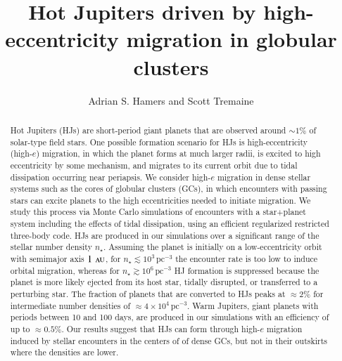 \documentclass[iop,usenatbib]{emulateapj}
\newcommand{\au}{\,\textsc{au}}
\begin{document}
\title{Hot Jupiters driven by high-eccentricity migration in globular clusters}

\author{Adrian S. Hamers and Scott Tremaine}


\begin{abstract} %
Hot Jupiters (HJs) are short-period giant planets that are observed around $\sim 1\%$ of solar-type field stars. One possible formation scenario for HJs is high-eccentricity (high-$e$) migration, in which the planet forms at much larger radii, is excited to high eccentricity by some mechanism, and migrates to its current orbit due to tidal dissipation occurring near periapsis. We consider high-$e$ migration in dense stellar systems such as the cores of globular clusters (GCs), in which encounters with passing stars can excite planets to the high eccentricities needed to initiate migration. We study this process via Monte Carlo simulations of encounters with a star+planet system including the effects of tidal dissipation, using an efficient regularized restricted three-body code. HJs are produced in our simulations over a significant range of the stellar number density $n_\star$. Assuming the planet is initially on a low-eccentricity orbit with semimajor axis $1\,\au$, for $n_\star \lesssim 10^3\,\mathrm{pc^{-3}}$ the encounter rate is too low to induce orbital migration, whereas for $n_\star \gtrsim 10^6\,\mathrm{pc^{-3}}$ HJ formation is suppressed because the planet is more likely ejected from its host star, tidally disrupted, or transferred to a perturbing star. The fraction of planets that are converted to HJs peaks at $\approx 2\%$ for intermediate number densities of $\approx 4\times 10^4\,\mathrm{pc^{-3}}$. Warm Jupiters, giant planets with periods between 10 and 100 days, are produced in our simulations with an efficiency of up to $\approx 0.5\%$. Our results suggest that HJs can form through high-$e$ migration induced by stellar encounters in the centers of of dense GCs, but not in their outskirts where the densities are lower. 
\end{abstract}

\end{document}
